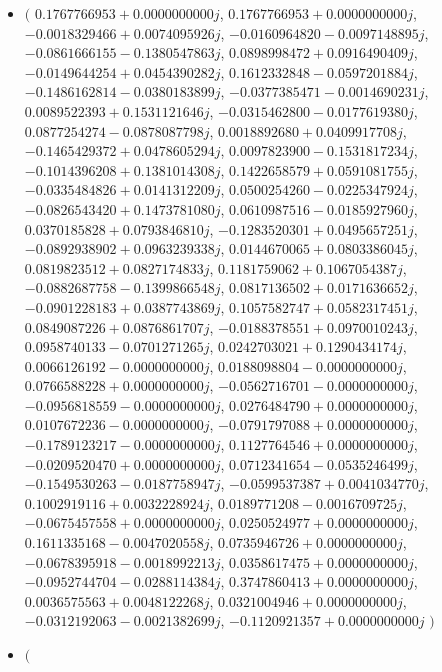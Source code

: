 \documentclass[14pt,a4paper]{article}
\begin{document}
\begin{itemize}
\item
$\big($
$0.1767766953+0.0000000000j$, $0.1767766953+0.0000000000j$, $-0.0018329466+0.0074095926j$, $-0.0160964820-0.0097148895j$, $-0.0861666155-0.1380547863j$, $0.0898998472+0.0916490409j$, $-0.0149644254+0.0454390282j$, $0.1612332848-0.0597201884j$, $-0.1486162814-0.0380183899j$, $-0.0377385471-0.0014690231j$, $0.0089522393+0.1531121646j$, $-0.0315462800-0.0177619380j$, $0.0877254274-0.0878087798j$, $0.0018892680+0.0409917708j$, $-0.1465429372+0.0478605294j$, $0.0097823900-0.1531817234j$, $-0.1014396208+0.1381014308j$, $0.1422658579+0.0591081755j$, $-0.0335484826+0.0141312209j$, $0.0500254260-0.0225347924j$, $-0.0826543420+0.1473781080j$, $0.0610987516-0.0185927960j$, $0.0370185828+0.0793846810j$, $-0.1283520301+0.0495657251j$, $-0.0892938902+0.0963239338j$, $0.0144670065+0.0803386045j$, $0.0819823512+0.0827174833j$, $0.1181759062+0.1067054387j$, $-0.0882687758-0.1399866548j$, $0.0817136502+0.0171636652j$, $-0.0901228183+0.0387743869j$, $0.1057582747+0.0582317451j$, $0.0849087226+0.0876861707j$, $-0.0188378551+0.0970010243j$, $0.0958740133-0.0701271265j$, $0.0242703021+0.1290434174j$, $0.0066126192-0.0000000000j$, $0.0188098804-0.0000000000j$, $0.0766588228+0.0000000000j$, $-0.0562716701-0.0000000000j$, $-0.0956818559-0.0000000000j$, $0.0276484790+0.0000000000j$, $0.0107672236-0.0000000000j$, $-0.0791797088+0.0000000000j$, $-0.1789123217-0.0000000000j$, $0.1127764546+0.0000000000j$, $-0.0209520470+0.0000000000j$, $0.0712341654-0.0535246499j$, $-0.1549530263-0.0187758947j$, $-0.0599537387+0.0041034770j$, $0.1002919116+0.0032228924j$, $0.0189771208-0.0016709725j$, $-0.0675457558+0.0000000000j$, $0.0250524977+0.0000000000j$, $0.1611335168-0.0047020558j$, $0.0735946726+0.0000000000j$, $-0.0678395918-0.0018992213j$, $0.0358617475+0.0000000000j$, $-0.0952744704-0.0288114384j$, $0.3747860413+0.0000000000j$, $0.0036575563+0.0048122268j$, $0.0321004946+0.0000000000j$, $-0.0312192063-0.0021382699j$, $-0.1120921357+0.0000000000j$
$\big)$
\item
$\big($

\end{itemize}
\end{document}
